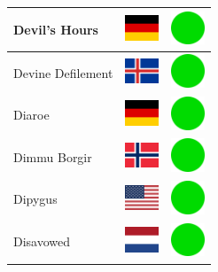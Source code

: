 \documentclass[12pt, a4paper, twoside]{report}
\begin{document}
\begin{center}
\begin{longtable}{|p{5cm}|p{2cm}|p{2cm}|}
 Devil's Hours                                              & \includegraphics[width=1cm]{../img/flags/de} &   \includegraphics[width=1cm]{../likes/y} \\ \hline
 Devine Defilement                                          & \includegraphics[width=1cm]{../img/flags/is} &   \includegraphics[width=1cm]{../likes/y} \\ \hline
 Diaroe                                                     & \includegraphics[width=1cm]{../img/flags/de} &   \includegraphics[width=1cm]{../likes/y} \\ \hline
 Dimmu Borgir                                               & \includegraphics[width=1cm]{../img/flags/no} &   \includegraphics[width=1cm]{../likes/y} \\ \hline
 Dipygus                                                    & \includegraphics[width=1cm]{../img/flags/us} &   \includegraphics[width=1cm]{../likes/y} \\ \hline
 Disavowed                                                  & \includegraphics[width=1cm]{../img/flags/nl} &   \includegraphics[width=1cm]{../likes/y} \\ \hline

\end{longtable}
\end{center}
\end{document}
